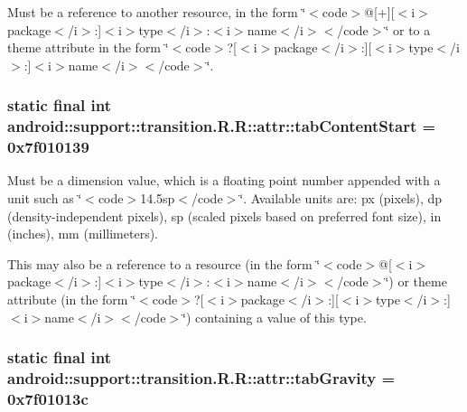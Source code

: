 Must be a reference to another resource, in the form \char`\"{}$<$code$>$@\mbox{[}+\mbox{]}\mbox{[}$<$i$>$package$<$/i$>$:\mbox{]}$<$i$>$type$<$/i$>$:$<$i$>$name$<$/i$>$$<$/code$>$\char`\"{} or to a theme attribute in the form \char`\"{}$<$code$>$?\mbox{[}$<$i$>$package$<$/i$>$:\mbox{]}\mbox{[}$<$i$>$type$<$/i$>$:\mbox{]}$<$i$>$name$<$/i$>$$<$/code$>$\char`\"{}. \hypertarget{classandroid_1_1support_1_1transition_1_1_r_1_1attr_07c9c19b0b605911e3e4af2a2b6cde64}{
\subsubsection[{tabContentStart}]{\setlength{\rightskip}{0pt plus 5cm}static final int android::support::transition.R.R::attr::tabContentStart = 0x7f010139}}
\label{classandroid_1_1support_1_1transition_1_1_r_1_1attr_07c9c19b0b605911e3e4af2a2b6cde64}


Must be a dimension value, which is a floating point number appended with a unit such as \char`\"{}$<$code$>$14.5sp$<$/code$>$\char`\"{}. Available units are: px (pixels), dp (density-independent pixels), sp (scaled pixels based on preferred font size), in (inches), mm (millimeters). 

This may also be a reference to a resource (in the form \char`\"{}$<$code$>$@\mbox{[}$<$i$>$package$<$/i$>$:\mbox{]}$<$i$>$type$<$/i$>$:$<$i$>$name$<$/i$>$$<$/code$>$\char`\"{}) or theme attribute (in the form \char`\"{}$<$code$>$?\mbox{[}$<$i$>$package$<$/i$>$:\mbox{]}\mbox{[}$<$i$>$type$<$/i$>$:\mbox{]}$<$i$>$name$<$/i$>$$<$/code$>$\char`\"{}) containing a value of this type. \hypertarget{classandroid_1_1support_1_1transition_1_1_r_1_1attr_8994dfb0576c9b8f00afdd1bfc7f22fc}{
\subsubsection[{tabGravity}]{\setlength{\rightskip}{0pt plus 5cm}static final int android::support::transition.R.R::attr::tabGravity = 0x7f01013c}}
\label{classandroid_1_1support_1_1transition_1_1_r_1_1attr_8994dfb0576c9b8f00afdd1bfc7f22fc}


